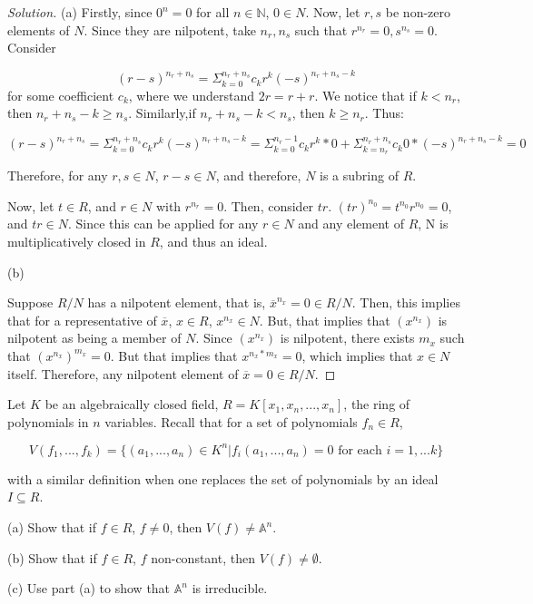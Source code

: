 \documentclass[10pt]{article}
\newenvironment{problem}[2][Problem]{\begin{trivlist}
\item[\hskip \labelsep {\bfseries #1}\hskip \labelsep {\bfseries #2.}]}{\end{trivlist}}
\begin{document}
\begin{proof}[Solution]

(a)
Firstly, since $0^n = 0$ for all $n \in \mathbb{N}$, $0 \in N$. Now, let $r,s$ be non-zero elements of $N$. Since they are nilpotent, take $n_r, n_s$ such that $r^{n_r} = 0, s^{n_s} = 0$. Consider

$$(r-s)^{n_r + n_s} = \Sigma_{k=0}^{n_r + n_s} c_k r^{k} (-s)^{n_r + n_s -k}$$ 
for some coefficient $c_k$, where we understand $2r = r + r$. We notice that if $k < n_r$, then $n_r + n_s - k \geq n_s$. Similarly,if $n_r + n_s -k < n_s$, then $k \geq n_r$. Thus:

$$(r-s)^{n_r + n_s} = \Sigma_{k=0}^{n_r + n_s} c_k r^{k} (-s)^{n_r + n_s -k} = \Sigma_{k=0}^{n_r - 1} c_k r^{k}* 0 + \Sigma_{k=n_r}^{n_r + n_s} c_k 0 * (-s)^{n_r + n_s -k} = 0$$

Therefore, for any $r,s \in N$, $r-s \in N$, and therefore, $N$ is a subring of $R$.

Now, let $t \in R$, and $r \in N$ with $r^{n_r} = 0$. Then, consider $tr$. $(tr)^{n_0} = t^{n_0} r^{n_0} = 0$, and $tr \in N$. Since this can be applied for any $r \in N$ and any element of $R$, N is multiplicatively closed in $R$, and thus an ideal.

(b)

Suppose $R/N$ has a nilpotent element, that is, $\overline{x}^{n_x} = 0 \in R/N$. Then, this implies that for a representative of $\overline{x}$, $x \in R$, $x ^ {n_x} \in N$. But, that implies that $(x^{n_x})$ is nilpotent as being a member of $N$. Since $(x^{n_x})$ is nilpotent, there exists $m_x$ such that $(x^{n_x})^{m_x} = 0$. But that implies that $x^{n_x*m_x} = 0$, which implies that $x \in N$ itself. Therefore, any nilpotent element of $\overline{x} = 0 \in R/N$.

\end{proof}

\begin{problem}{1.3}
Let $K$ be an algebraically closed field, $R = K[x_1,x_n,...,x_n]$, the ring of polynomials in $n$ variables. Recall that for a set of polynomials $f_n \in R$,

$$ V(f_1,...,f_k) = \{(a_1,...,a_n) \in K^n | f_i(a_1,...,a_n) = 0 \text{ for each } i = 1,...k \}$$

with a similar definition when one replaces the set of polynomials by an ideal $I \subseteq R$.


(a) Show that if $f \in R$, $f \not=0$, then $V(f) \not=\mathbb{A}^n$.

(b) Show that if $f \in R$, $f$ non-constant, then $V(f) \not= \emptyset$.

(c) Use part (a) to show that $\mathbb{A}^n$ is irreducible.

\end{problem}
\end{document}
